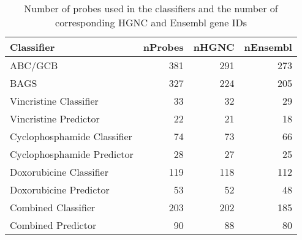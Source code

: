 \begin{table}[ht]
\centering
\begin{tabular}{lrrr}
  \hline
Classifier & nProbes & nHGNC & nEnsembl \\ 
  \hline
ABC/GCB & 381 & 291 & 273 \\ 
  BAGS & 327 & 224 & 205 \\ 
  Vincristine Classifier & 33 & 32 & 29 \\ 
  Vincristine Predictor & 22 & 21 & 18 \\ 
  Cyclophosphamide Classifier & 74 & 73 & 66 \\ 
  Cyclophosphamide Predictor & 28 & 27 & 25 \\ 
  Doxorubicine Classifier & 119 & 118 & 112 \\ 
  Doxorubicine Predictor & 53 & 52 & 48 \\ 
  Combined Classifier & 203 & 202 & 185 \\ 
  Combined Predictor & 90 & 88 & 80 \\ 
   \hline
\end{tabular}
\caption{Number of probes used in the classifiers and the number of corresponding HGNC and Ensembl gene IDs} 
\label{probeTable}
\end{table}
